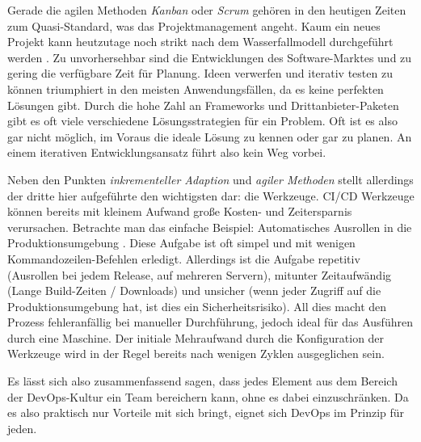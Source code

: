 Gerade die agilen Methoden \emph{Kanban} oder \emph{Scrum} \cite{froemlingAgileMethodenWas2021} gehören in den heutigen Zeiten zum Quasi-Standard, was das Projektmanagement angeht. Kaum ein neues Projekt kann heutzutage noch strikt nach dem Wasserfallmodell durchgeführt werden \cite{tutorialspointSDLCWaterfallModel}. Zu unvorhersehbar sind die Entwicklungen des Software-Marktes und zu gering die verfügbare Zeit für Planung.
Ideen verwerfen und iterativ testen zu können triumphiert in den meisten Anwendungsfällen, da es keine \glqq perfekten\grqq{} Lösungen gibt.
Durch die hohe Zahl an Frameworks und Drittanbieter-Paketen gibt es oft viele verschiedene Lösungsstrategien für ein Problem.
Oft ist es also gar nicht möglich, im Voraus die \glqq ideale\grqq{} Lösung zu kennen oder gar zu planen. An einem iterativen Entwicklungsansatz führt also kein Weg vorbei.

Neben den Punkten \emph{inkrementeller Adaption} und \emph{agiler Methoden} stellt allerdings der dritte hier aufgeführte den wichtigsten dar: die Werkzeuge.
CI/CD Werkzeuge können bereits mit kleinem Aufwand große Kosten- und Zeitersparnis verursachen. 
Betrachte man das einfache Beispiel: Automatisches Ausrollen in die Produktionsumgebung \cite{sonBeginnerGuideBuilding2019}. 
Diese Aufgabe ist oft simpel und mit wenigen Kommandozeilen-Befehlen erledigt. Allerdings ist die Aufgabe repetitiv (Ausrollen bei jedem Release, auf mehreren Servern), mitunter Zeitaufwändig (Lange Build-Zeiten / Downloads) und unsicher (wenn jeder Zugriff auf die Produktionsumgebung hat, ist dies ein Sicherheitsrisiko).
All dies macht den Prozess fehleranfällig bei manueller Durchführung, jedoch ideal für das Ausführen durch eine Maschine. 
Der initiale Mehraufwand durch die Konfiguration der Werkzeuge wird in der Regel bereits nach wenigen Zyklen ausgeglichen sein. 

Es lässt sich also zusammenfassend sagen, dass jedes Element aus dem Bereich der DevOps-Kultur ein Team bereichern kann, ohne es dabei einzuschränken.
Da es also praktisch nur Vorteile mit sich bringt, eignet sich DevOps im Prinzip für jeden.
